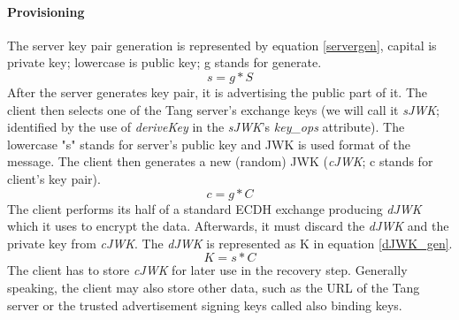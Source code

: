 \paragraph{Provisioning}
The server key pair generation is represented by equation \ref{servergen}, capital is private key; lowercase is public key; g stands for generate.
\begin{equation}\label{servergen}
    s = g * S
\end{equation}
After the server generates key pair, it is advertising the public part of it.
The client then selects one of the Tang server's exchange keys (we will call it {\it sJWK}; identified by the use of {\it deriveKey} in the {\it sJWK}'s {\it key\_ops} attribute).
The lowercase "s" stands for server's public key and JWK is used format of the message.
The client then generates a new (random) JWK ({\it cJWK}; c stands for client's key pair).
\begin{equation}\label{clientgen}
    c = g * C
\end{equation}
The client performs its half of a standard ECDH exchange producing {\it dJWK} which it uses to encrypt the data.
Afterwards, it must discard the {\it dJWK} and the private key from {\it cJWK}.
The {\it dJWK} is represented as K in equation \ref{dJWK_gen}.
\begin{equation}\label{dJWK_gen}
    K = s * C
\end{equation}
The client has to store {\it cJWK} for later use in the recovery step.
Generally speaking, the client may also store other data, such as the URL of the Tang server or the trusted advertisement signing keys called also binding keys.



